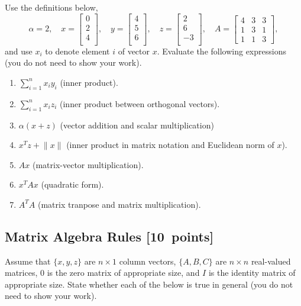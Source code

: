 \documentclass{article}
\newcommand{\blu}[1]{{\textcolor{blu}{#1}}}
\let\ask\blu
\newcommand\pts[1]{\textcolor{pointscolour}{[#1~points]}}
\newcommand{\norm}[1]{\lVert #1 \rVert}
\begin{document}
  Use the definitions below,
  \[
  \alpha = 2,\quad
  x = \left[\begin{array}{c}
  0\\
  2\\
  4\\
  \end{array}\right], \quad
  y = \left[\begin{array}{c}
  4\\
  5\\
  6\\
  \end{array}\right],\quad
  z = \left[\begin{array}{c}
  2\\
  6\\
  -3\\
  \end{array}\right],\quad
  A = \left[\begin{array}{ccc}
  4 & 3 & 3\\
  1 & 3 & 1\\
  1 & 1 & 3
  \end{array}\right],
  \]
  and use $x_i$ to denote element $i$ of vector $x$.
  \ask{Evaluate the following expressions} (you do not need to show your work).
  \begin{enumerate}
  \item $\sum_{i=1}^n x_iy_i$ (inner product).
  \item $\sum_{i=1}^n x_i z_i$ (inner product between orthogonal vectors).
  \item $\alpha(x+z)$ (vector addition and scalar multiplication)
  \item $x^Tz + \norm{x}$ (inner product in matrix notation and Euclidean norm of $x$).
  \item $Ax$ (matrix-vector multiplication).
  \item $x^TAx$ (quadratic form).
  \item $A^TA$ (matrix tranpose and matrix multiplication).
  \end{enumerate}

  \subsection{Matrix Algebra Rules \pts{10}}

  Assume that $\{x,y,z\}$ are $n \times 1$ column vectors, $\{A,B,C\}$ are $n \times n$ real-valued matrices, $0$ is the zero matrix of appropriate size, and $I$ is the identity matrix of appropriate size. \ask{State whether each of the below is true in general} (you do not need to show your work).
\end{document}
